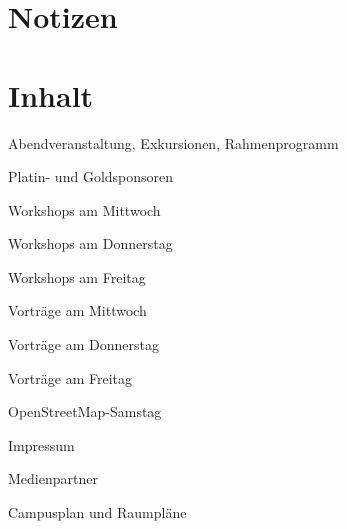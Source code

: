 \section*{Notizen}

\newpage
{}
\section*{Inhalt}
\label{contents}
\newlength\contentspace
\setlength\contentspace{0.2em}

\vspace*{\contentspace}%
\noindent Abendveranstaltung, Exkursionen, Rahmenprogramm  \dotfill \pageref{schwaetzli}

\vspace*{\contentspace}%
\noindent Platin- und Goldsponsoren \dotfill \pageref{platinsposoren}

\vspace*{\contentspace}%
\noindent Workshops am Mittwoch \dotfill \pageref{mittwoch-workshops}

\vspace*{\contentspace}%
\noindent Workshops am Donnerstag \dotfill \pageref{donnerstag-workshops}

\vspace*{\contentspace}%
\noindent Workshops am Freitag \dotfill \pageref{freitag-workshops}

\vspace*{\contentspace}%
\noindent Vorträge am Mittwoch \dotfill \pageref{mittwoch}

\vspace*{\contentspace}%
\noindent Vorträge am Donnerstag \dotfill \pageref{donnerstag}

\vspace*{\contentspace}%
\noindent Vorträge am Freitag \dotfill \pageref{freitag}

\vspace*{\contentspace}%
\noindent OpenStreetMap-Samstag \dotfill \pageref{samstag}

\vspace*{\contentspace}%
\noindent Impressum \dotfill \pageref{impressum}

\vspace*{\contentspace}%
\noindent Medienpartner \dotfill \pageref{medienpartner}

\vspace*{\contentspace}%
\noindent Campusplan und Raumpläne \dotfill \pageref{kartenseiten}

\justifying

\newpage
